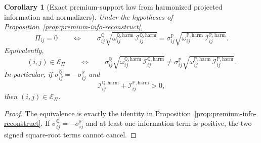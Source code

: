 \documentclass[11pt,a4paper]{amsart}
\theoremstyle{plain}
\newtheorem{corollary}[theorem]{Corollary}
\theoremstyle{definition}
\theoremstyle{remark}
\newcommand{\PP}{\mathbb{P}}
\newcommand{\QQ}{\mathbb{Q}}
\newcommand{\cE}{\mathcal{E}}
\begin{document}
\begin{corollary}[Exact premium-support law from harmonized projected information and normalizers]\label{cor:premium-support-info-exact}
Under the hypotheses of Proposition~\ref{prop:premium-info-reconstruct},
\[
        \Pi_{ij}=0
        \qquad\Longleftrightarrow\qquad
        \sigma_{ij}^\QQ
        \sqrt{
                \omega_{ij}^{\QQ,\mathrm{harm}}\,
                \mathcal I_{ij}^{\QQ,\mathrm{harm}}
        }
        =
        \sigma_{ij}^\PP
        \sqrt{
                \omega_{ij}^{\PP,\mathrm{harm}}\,
                \mathcal I_{ij}^{\PP,\mathrm{harm}}
        }.
\]
Equivalently,
\[
        (i,j)\in\cE_\Pi
        \qquad\Longleftrightarrow\qquad
        \sigma_{ij}^\QQ
        \sqrt{
                \omega_{ij}^{\QQ,\mathrm{harm}}\,
                \mathcal I_{ij}^{\QQ,\mathrm{harm}}
        }
        \neq
        \sigma_{ij}^\PP
        \sqrt{
                \omega_{ij}^{\PP,\mathrm{harm}}\,
                \mathcal I_{ij}^{\PP,\mathrm{harm}}
        }.
\]
In particular, if \(\sigma_{ij}^\QQ=-\sigma_{ij}^\PP\) and
\[
        \mathcal I_{ij}^{\QQ,\mathrm{harm}}
        +
        \mathcal I_{ij}^{\PP,\mathrm{harm}}
        >
        0,
\]
then \((i,j)\in\cE_\Pi\).
\end{corollary}

\begin{proof}
The equivalence is exactly the identity in Proposition~\ref{prop:premium-info-reconstruct}.  If
\(\sigma_{ij}^\QQ=-\sigma_{ij}^\PP\) and at least one information term is positive, the two signed
square-root terms cannot cancel.
\end{proof}
\end{document}

